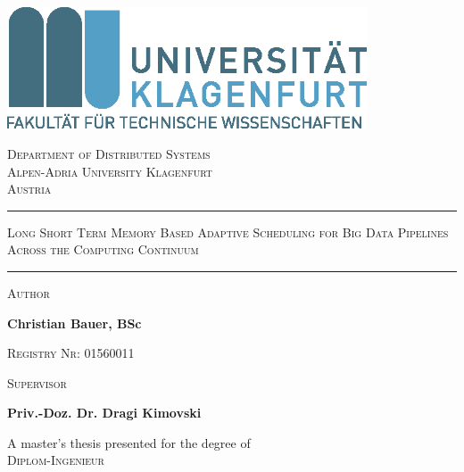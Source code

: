 \begin{titlingpage}
    \begin{center}
        \includegraphics[width=0.8\textwidth]{figures/AAU_LOGO_2017.png}

        \vspace{0.5cm}

        \textsc{Department of Distributed Systems}\\
        \textsc{Alpen-Adria University Klagenfurt}\\
        \textsc{Austria}\\

        \date{\today}

        \vspace{3.5cm}

        \LARGE
        \par\rule{\textwidth}{2pt}
        \textsc{Long Short Term Memory Based Adaptive Scheduling for Big Data Pipelines Across the Computing Continuum}
        \par\rule{\textwidth}{2pt} 
            
        \vspace{4cm}

        \large
        \begin{minipage}{.5\textwidth}
            \textsc{Author}

            \textbf{Christian Bauer, BSc}

            \textsc{Registry Nr: 01560011}

        \end{minipage}%
        \begin{minipage}{.5\textwidth}
            \textsc{Supervisor}

            \textbf{Priv.-Doz. Dr. Dragi Kimovski}
        \end{minipage}



       \vfill
            
       A master's thesis presented for the degree of\\
       \textsc{Diplom-Ingenieur}
            
    \end{center}
\end{titlingpage}